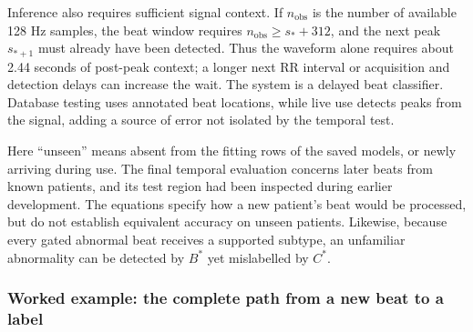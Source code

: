 Inference also requires sufficient signal context. If $n_{\mathrm{obs}}$ is
the number of available 128 Hz samples, the beat window requires
$n_{\mathrm{obs}}\geq s_*+312$, and the next peak $s_{*+1}$ must already
have been detected. Thus the waveform alone requires about 2.44 seconds of
post-peak context; a longer next RR interval or acquisition and detection
delays can increase the wait. The system is a delayed beat classifier.
Database testing uses annotated beat locations, while live use detects peaks
from the signal, adding a source of error not isolated by the temporal test.

Here ``unseen'' means absent from the fitting rows of the saved models, or
newly arriving during use. The final temporal evaluation concerns later beats
from known patients, and its test region had been inspected during earlier
development. The equations specify how a new patient's beat would be
processed, but do not establish equivalent accuracy on unseen patients.
Likewise, because every gated abnormal beat receives a supported subtype,
an unfamiliar abnormality can be detected by $B^*$ yet mislabelled by $C^*$.

\newpage
\subsubsection*{Worked example: the complete path from a new beat to a label}

